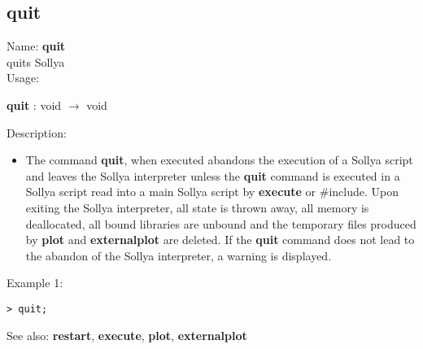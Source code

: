 \subsection{ quit }
\noindent Name: \textbf{quit}\\
quits Sollya\\

\noindent Usage: 
\begin{center}
\textbf{quit} : \textsf{void} $\rightarrow$ \textsf{void}\\
\end{center}
\noindent Description: \begin{itemize}

\item The command \textbf{quit}, when executed abandons the execution of a Sollya
   script and leaves the Sollya interpreter unless the \textbf{quit} command 
   is executed in a Sollya script read into a main Sollya script by
   \textbf{execute} or $\#$include.
   Upon exiting the Sollya interpreter, all state is thrown away, all
   memory is deallocated, all bound libraries are unbound and the
   temporary files produced by \textbf{plot} and \textbf{externalplot} are deleted.
   If the \textbf{quit} command does not lead to the abandon of the Sollya
   interpreter, a warning is displayed.
\end{itemize}
\noindent Example 1: 
\begin{center}\begin{minipage}{15cm}\begin{Verbatim}[frame=single]
> quit;
\end{Verbatim}
\end{minipage}\end{center}
See also: \textbf{restart}, \textbf{execute}, \textbf{plot}, \textbf{externalplot}
